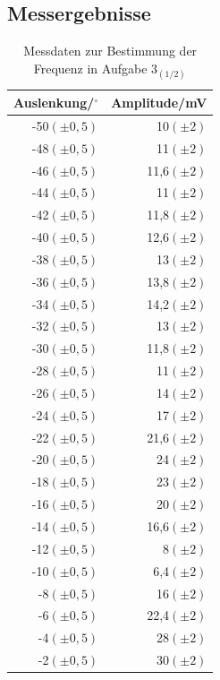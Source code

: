 \documentclass[12pt]{scrartcl}
\begin{document}
\subsection{Messergebnisse}
\begin{table}[H]
\caption{Messdaten zur Bestimmung der Frequenz in Aufgabe 3$_{(1/2)}$}
\begin{center}
\begin{tabular}{|r|r|}
\hline
Auslenkung/$^\circ$ & Amplitude/mV \\ \hline
-50$(\pm 0,5)$ & 10$(\pm 2)$ \\ \hline
-48$(\pm 0,5)$ & 11$(\pm 2)$ \\ \hline
-46$(\pm 0,5)$ & 11,6$(\pm 2)$ \\ \hline
-44$(\pm 0,5)$ & 11$(\pm 2)$ \\ \hline
-42$(\pm 0,5)$ & 11,8$(\pm 2)$ \\ \hline
-40$(\pm 0,5)$ & 12,6$(\pm 2)$ \\ \hline
-38$(\pm 0,5)$ & 13$(\pm 2)$ \\ \hline
-36$(\pm 0,5)$ & 13,8$(\pm 2)$ \\ \hline
-34$(\pm 0,5)$ & 14,2$(\pm 2)$ \\ \hline
-32$(\pm 0,5)$ & 13$(\pm 2)$ \\ \hline
-30$(\pm 0,5)$ & 11,8$(\pm 2)$ \\ \hline
-28$(\pm 0,5)$ & 11$(\pm 2)$ \\ \hline
-26$(\pm 0,5)$ & 14$(\pm 2)$ \\ \hline
-24$(\pm 0,5)$ & 17$(\pm 2)$ \\ \hline
-22$(\pm 0,5)$ & 21,6$(\pm 2)$ \\ \hline
-20$(\pm 0,5)$ & 24$(\pm 2)$ \\ \hline
-18$(\pm 0,5)$ & 23$(\pm 2)$ \\ \hline
-16$(\pm 0,5)$ & 20$(\pm 2)$ \\ \hline
-14$(\pm 0,5)$ & 16,6$(\pm 2)$ \\ \hline
-12$(\pm 0,5)$ & 8$(\pm 2)$ \\ \hline
-10$(\pm 0,5)$ & 6,4$(\pm 2)$ \\ \hline
-8$(\pm 0,5)$ & 16$(\pm 2)$ \\ \hline
-6$(\pm 0,5)$ & 22,4$(\pm 2)$ \\ \hline
-4$(\pm 0,5)$ & 28$(\pm 2)$ \\ \hline
-2$(\pm 0,5)$ & 30$(\pm 2)$ \\ \hline
\end{tabular}
\end{center}
\label{tab:aufgabe3_1}
\end{table}
\end{document}
